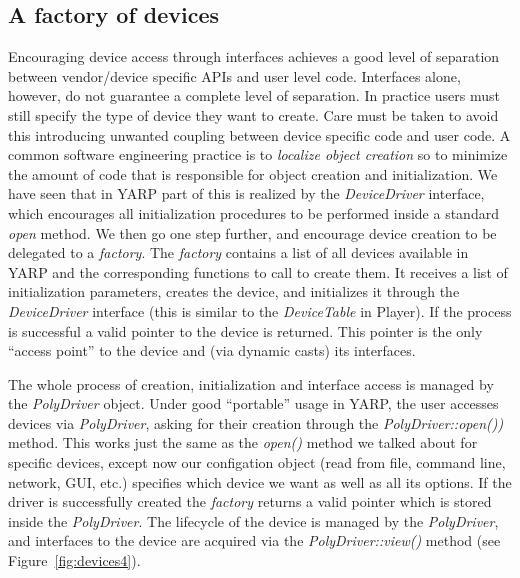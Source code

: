 \subsection{A factory of devices}
Encouraging device access through 
interfaces achieves a good level of separation between vendor/device 
specific APIs and user level code. Interfaces alone, however, do not 
guarantee a complete level of separation. In practice users must still 
specify the type of device they want to create. Care must be taken to 
avoid  this introducing unwanted coupling between device specific code and 
user code. A common software 
engineering practice is to \emph{localize object creation} so to 
minimize the amount of code that is responsible for object creation 
and initialization. 
We have seen that in YARP part of this is realized by the 
\emph{DeviceDriver} interface, which encourages all initialization procedures 
to be performed inside a standard \emph{open} method. 
We then go one step further, and encourage device creation to be
delegated to a \emph{factory}. The \emph{factory} contains a list of 
all devices available in YARP and the corresponding functions to call 
to create them. It receives a list of initialization parameters, 
creates the device, and initializes it 
through the \emph{DeviceDriver} interface (this is similar to
the \emph{DeviceTable} in Player).
If the process is successful
a valid pointer to the device is returned. This pointer is the only 
``access point'' to the device and (via dynamic casts) its interfaces.
%
%

The whole process of creation, initialization and interface access is 
managed by the \emph{PolyDriver} object. 
Under good ``portable'' usage in YARP, the user accesses devices
via \emph{PolyDriver}, asking for their
creation through the \emph{PolyDriver::open())} method. 
%
This works just the same as the \emph{open()} method we
talked about for specific devices, except now our configation
object (read from file, command line, network, GUI, etc.)
specifies which device we want as well as all its options.
%
%
If the driver is successfully 
created the \emph{factory} returns a valid pointer which is stored inside 
the \emph{PolyDriver}. The lifecycle of the device is managed by the 
\emph{PolyDriver}, and interfaces to the device are acquired via 
the  \emph{PolyDriver::view()} method (see Figure~\ref{fig:devices4}).

